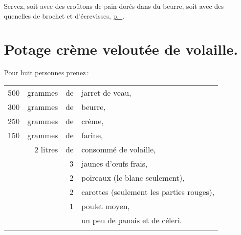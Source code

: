 Servez, soit avec des croûtons de pain dorés dans du beurre, soit avec des
quenelles de brochet et d'écrevisses, \hyperlink{p0328}{p. \pageref{pg0328}}.

\section*{\centering Potage crème veloutée de volaille.}
\label{pg0239} \hypertarget{p0239}{}

Pour huit personnes prenez :

\medskip

\footnotesize
\begin{longtable}{rrrp{16em}}                                                    
    500 & grammes   & de & jarret de veau,                                                                \\
    300 & grammes   & de & beurre,                                                                        \\
    250 & grammes   & de & crème,                                                                         \\
    150 & grammes   & de & farine,                                                                        \\
        & 2 litres  & de & consommé de volaille,                                                          \\
        &           &  3 & jaunes d'œufs frais,                                                           \\
        &           &  2 & poireaux (le blanc seulement),                                                 \\
        &           &  2 & carottes (seulement les parties rouges),                                       \\
        &           &  1 & poulet moyen,                                                                  \\
        &           &    & un peu de panais et de céleri.                                                 \\
                                                                                                          \\
\end{longtable}
\normalsize

